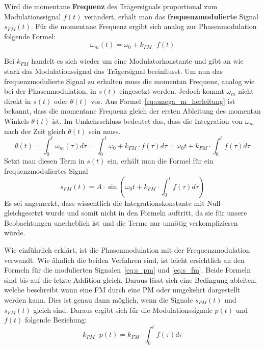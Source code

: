 Wird die momentane \textbf{Frequenz} des Trägersignals proportional zum Modulationssignal \(f(t)\) verändert, erhält man das \textbf{frequenzmodulierte} Signal \(s_{FM}(t)\). \cite[S. 210]{lathi} Für die momentane Frequenz ergibt sich analog zur Phasenmodulation folgende Formel:
\begin{equation}
\omega_m(t)=\omega_0+k_{FM}\cdot f(t)
\label{eq:omega_m}
\end{equation}

Bei \(k_{FM}\) handelt es sich wieder um eine Modulatorkonstante und gibt an wie stark das Modulationssignal das Trägersignal beeinflusst. Um nun das frequenzmodulierte Signal zu erhalten muss die momentan Frequenz, analog wie bei der Phasenmodulation, in \(s(t)\) eingesetzt werden. Jedoch kommt \(\omega_m\) nicht direkt in \(s(t)\) oder \(\theta(t)\) vor. Aus Formel~\ref{eq:omega_m_herleitung} ist bekannt, dass die momentane Frequenz gleich der ersten Ableitung des momentan Winkels \(\theta(t)\) ist. Im Umkehrschluss bedeutet das, dass die Integration von \(\omega_m\) nach der Zeit gleich \(\theta(t)\) sein muss.
\begin{equation*}
\theta(t)=\int_0^t{\omega_m(\tau)} d\tau = \int_0^t{\omega_0 + k_{FM}\cdot f(\tau)} d\tau = \omega_0t + k_{FM} \cdot \int_0^t{f(\tau)} d\tau
\end{equation*}
Setzt man diesen Term in \(s(t)\) ein, erhält man die Formel für ein frequenzmoduliertes Signal
\begin{equation}
s_{FM}(t)=A\cdot\sin(\omega_0t + k_{FM} \cdot \int_0^t{f(\tau)} d\tau)
\label{eq:s_fm}
\end{equation}
Es sei angemerkt, dass wissentlich die Integrationskonstante mit Null gleichgesetzt wurde und somit nicht in den Formeln auftritt, da sie für unsere Beobachtungen unerheblich ist und die Terme nur unnötig verkomplizieren würde.

Wie einführlich erklärt, ist die Phasenmodulation mit der Frequenzmodulation verwandt. Wie ähnlich die beiden Verfahren sind, ist leicht ersichtlich an den Formeln für die modulierten Signalen~\ref{eq:s_pm} und \ref{eq:s_fm}. Beide Formeln sind bis auf die letzte Addition gleich. Daraus lässt sich eine Bedingung ableiten, welche beschreibt wann eine FM durch eine PM oder umgekehrt dargestellt werden kann. Dies ist genau dann möglich, wenn die Signale \(s_{PM}(t)\) und \(s_{FM}(t)\) gleich sind. Daraus ergibt sich für die Modulationssignale \(p(t)\) und \(f(t)\) folgende Beziehung:
\begin{equation}
k_{PM}\cdot p(t)=k_{FM} \cdot  \int_0^t{f(\tau)} d\tau
\end{equation}

